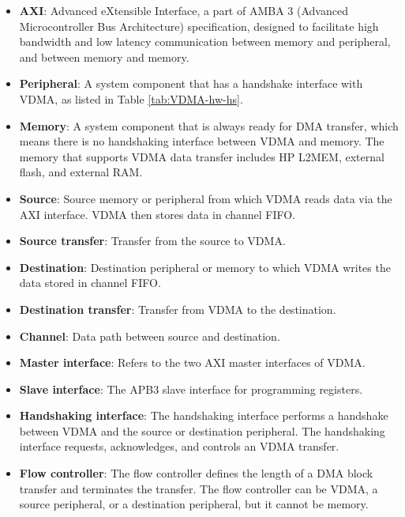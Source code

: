 \documentclass[main\_\_EN.tex]{subfiles}
\begin{document}
\begin{itemize}
    \item \textbf{AXI}: Advanced eXtensible Interface, a part of AMBA 3 (Advanced Microcontroller Bus Architecture) specification, designed to facilitate high bandwidth and low latency communication between memory and peripheral, and between memory and memory.


    \item \textbf{Peripheral}: A system component that has a handshake interface with VDMA, as listed in Table \ref{tab:VDMA-hw-hs}.

    \item \textbf{Memory}: A system component that is always ready for DMA transfer, which means there is no handshaking interface between VDMA and memory. The memory that supports VDMA data transfer includes HP L2MEM, external flash, and external RAM.

    \item \textbf{Source}: Source memory or peripheral from which VDMA reads data via the AXI interface. VDMA then stores data in channel FIFO.

    \item \textbf{Source transfer}: Transfer from the source to VDMA.

    \item \textbf{Destination}: Destination peripheral or memory to which VDMA writes the data stored in channel FIFO.

    \item \textbf{Destination transfer}: Transfer from VDMA to the destination.

    \item \textbf{Channel}: Data path between source and destination.

    \item \textbf{Master interface}: Refers to the two AXI master interfaces of VDMA.

    \item \textbf{Slave interface}: The APB3 slave interface for programming registers.

    \item \textbf{Handshaking interface}: The handshaking interface performs a handshake between VDMA and the source or destination peripheral. The handshaking interface requests, acknowledges, and controls an VDMA transfer.

    \item \textbf{Flow controller}: The flow controller defines the length of a DMA block transfer and terminates the transfer. The flow controller can be VDMA, a source peripheral, or a destination peripheral, but it cannot be memory.
\end{itemize}
\end{document}
